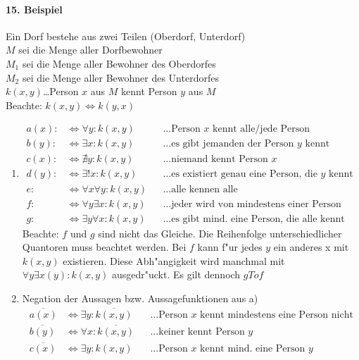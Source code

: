 \paragraph{15. Beispiel} Ein Dorf bestehe aus zwei Teilen (Oberdorf, Unterdorf)\\
$M$ sei die Menge aller Dorfbewohner\\
$M_1$ sei die Menge aller Bewohner des Oberdorfes\\
$M_2$ sei die Menge aller Bewohner des Unterdorfes\\
$k(x,y)$\dots Person $x$ aus $M$ kennt Person $y$ aus $M$\\
Beachte: $k(x,y)\Leftrightarrow k(y,x)$
\begin{enumerate}[label=\alph*)]
	\item \begin{align*}
	a(x):&\Leftrightarrow\forall y:k(x,y)&&\dots\text{Person }x\text{ kennt alle/jede Person}\\
	b(y):&\Leftrightarrow\exists x:k(x,y)&&\dots\text{es gibt jemanden der Person }y\text{ kennt}\\
	c(x):&\Leftrightarrow\nexists y:k(x,y)&&\dots\text{niemand kennt Person }x\\
	d(y):&\Leftrightarrow\exists!x:k(x,y)&&\dots\text{es existiert genau eine Person, die }y\text{ kennt}\\
	e:&\Leftrightarrow\forall x\forall y:k(x,y)&&\dots\text{alle kennen alle}\\
	f:&\Leftrightarrow\forall y\exists x:k(x,y)&&\dots\text{jeder wird von mindestens einer Person gekannt}\\
	g:&\Leftrightarrow\exists y\forall x:k(x,y)&&\dots\text{es gibt mind. eine Person, die alle kennt}
	\end{align*}
	Beachte: $f$ und $g$ sind nicht das Gleiche. Die Reihenfolge unterschiedlicher Quantoren muss beachtet werden. Bei $f$ kann f"ur jedes $y$ ein anderes x mit $k(x,y)$ existieren. Diese Abh"angigkeit wird manchmal mit $\forall y\exists x(y):k(x,y)$ ausgedr"uckt. Es gilt dennoch $gTo f$
	\item Negation der Aussagen bzw. Aussagefunktionen aus a)
	\begin{align*}
		\overline{a(x)}&\Leftrightarrow\exists y:\overline{k(x,y)}&&\dots\text{Person }x\text{ kennt mindestens eine Person nicht}\\
		\overline{b(y)}&\Leftrightarrow\forall x:\overline{k(x,y)}&&\dots\text{keiner kennt Person }y\\
		\overline{c(x)}&\Leftrightarrow\exists y:k(x,y)&&\dots\text{Person }x\text{ kennt mind. eine Person }y\\

\end{align*}
\end{enumerate}
